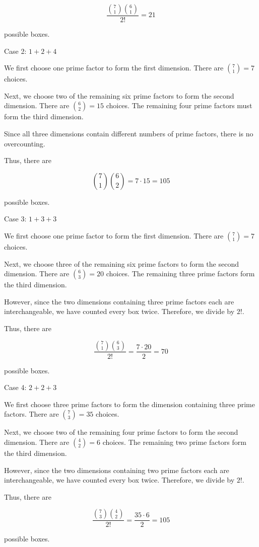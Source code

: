 \begin{enumerate}
 
 \[\frac{\binom{7}{1}\binom{6}{1}}{2!}=21\]

 possible boxes.

 
Case 2: $1+2+4$

 We first choose one prime factor to form the first dimension. There are $\binom{7}{1}=7$ choices.

 Next, we choose two of the remaining six prime factors to form the second dimension. There are $\binom{6}{2}=15$ choices. The remaining four prime factors must form the third dimension.

 Since all three dimensions contain different numbers of prime factors, there is no overcounting.

 Thus, there are

 
 \[\binom{7}{1}\binom{6}{2}=7\cdot15=105\]

 possible boxes.

 
Case 3: $1+3+3$

 We first choose one prime factor to form the first dimension. There are $\binom{7}{1}=7$ choices.

 Next, we choose three of the remaining six prime factors to form the second dimension. There are $\binom{6}{3}=20$ choices. The remaining three prime factors form the third dimension.

 However, since the two dimensions containing three prime factors each are interchangeable, we have counted every box twice. Therefore, we divide by $2!$.

 Thus, there are

 
 \[\frac{\binom{7}{1}\binom{6}{3}}{2!}=\frac{7\cdot20}{2}=70\]

 possible boxes.

 
Case 4: $2+2+3$

 We first choose three prime factors to form the dimension containing three prime factors. There are $\binom{7}{3}=35$ choices.

 Next, we choose two of the remaining four prime factors to form the second dimension. There are $\binom{4}{2}=6$ choices. The remaining two prime factors form the third dimension.

 However, since the two dimensions containing two prime factors each are interchangeable, we have counted every box twice. Therefore, we divide by $2!$.

 Thus, there are

 
 \[\frac{\binom{7}{3}\binom{4}{2}}{2!}=\frac{35\cdot6}{2}=105\]

 possible boxes.


\end{enumerate}

